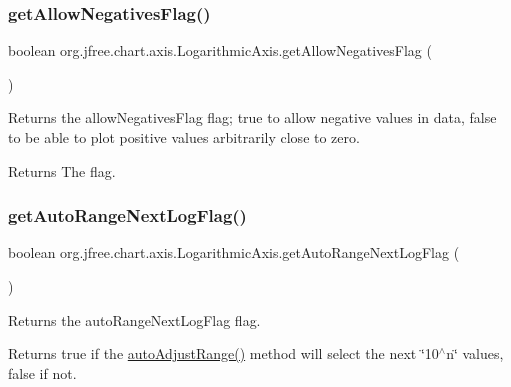 \subsubsection{\texorpdfstring{get\+Allow\+Negatives\+Flag()}{getAllowNegativesFlag()}}
{\footnotesize\ttfamily boolean org.\+jfree.\+chart.\+axis.\+Logarithmic\+Axis.\+get\+Allow\+Negatives\+Flag (\begin{DoxyParamCaption}{ }\end{DoxyParamCaption})}

Returns the \textquotesingle{}allow\+Negatives\+Flag\textquotesingle{} flag; true to allow negative values in data, false to be able to plot positive values arbitrarily close to zero.

\begin{DoxyReturn}{Returns}
The flag. 
\end{DoxyReturn}
\mbox{\label{classorg_1_1jfree_1_1chart_1_1axis_1_1_logarithmic_axis_a9a34b418d26586425226627f05ced14d}} 
\subsubsection{\texorpdfstring{get\+Auto\+Range\+Next\+Log\+Flag()}{getAutoRangeNextLogFlag()}}
{\footnotesize\ttfamily boolean org.\+jfree.\+chart.\+axis.\+Logarithmic\+Axis.\+get\+Auto\+Range\+Next\+Log\+Flag (\begin{DoxyParamCaption}{ }\end{DoxyParamCaption})}

Returns the \textquotesingle{}auto\+Range\+Next\+Log\+Flag\textquotesingle{} flag.

\begin{DoxyReturn}{Returns}
{\ttfamily true} if the \textquotesingle{}\mbox{\hyperlink{classorg_1_1jfree_1_1chart_1_1axis_1_1_logarithmic_axis_a0f54dfcb35d307b607012249d644b4a3}{auto\+Adjust\+Range()}}\textquotesingle{} method will select the next \char`\"{}10$^\wedge$n\char`\"{} values, {\ttfamily false} if not. 
\end{DoxyReturn}
\mbox{\label{classorg_1_1jfree_1_1chart_1_1axis_1_1_logarithmic_axis_a19cd5a25466ad4c709c934768d9c41bb}} 
